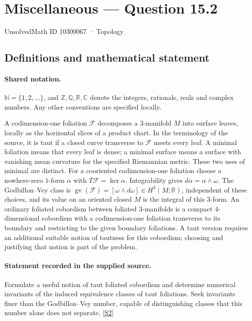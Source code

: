 \documentclass[11pt]{article}
\newcommand{\sref}[2]{\hyperlink{source:#1:#2}{[S#2]}}
\begin{document}
\setcounter{section}{10300066}
\section{Miscellaneous — Question 15.2}\label{10300067}
{\small\sffamily UnsolvedMath ID 10300067 · Topology}
\subsection{Definitions and mathematical statement}

\paragraph{Shared notation.}$\mathbb N=\{1,2,\ldots\}$, and $\mathbb Z,\mathbb Q,\mathbb R,\mathbb C$ denote the integers, rationals, reals and complex numbers. Any other conventions are specified locally.


A codimension-one foliation $\mathcal F$ decomposes a $3$-manifold $M$ into surface leaves, locally as the horizontal slices of a product chart. In the terminology of the source, it is taut if a closed curve transverse to $\mathcal F$ meets every leaf. A minimal foliation means that every leaf is dense; a minimal surface means a surface with vanishing mean curvature for the specified Riemannian metric. These two uses of minimal are distinct. For a cooriented codimension-one foliation choose a nowhere-zero $1$-form $\alpha$ with $T\mathcal F=\ker\alpha$. Integrability gives $d\alpha=\alpha\wedge\omega$. The Godbillon--Vey class is $\operatorname{gv}(\mathcal F)=[\omega\wedge d\omega]\in H^3(M;\mathbb R)$, independent of these choices, and its value on an oriented closed $M$ is the integral of this $3$-form. An ordinary foliated cobordism between foliated $3$-manifolds is a compact $4$-dimensional cobordism with a codimension-one foliation transverse to its boundary and restricting to the given boundary foliations. A taut version requires an additional suitable notion of tautness for this cobordism; choosing and justifying that notion is part of the problem.
\paragraph{Statement recorded in the supplied source.}
Formulate a useful notion of taut foliated cobordism and determine numerical invariants of the induced equivalence classes of taut foliations. Seek invariants finer than the Godbillon--Vey number, capable of distinguishing classes that this number alone does not separate. \sref{10300067}{2}
\end{document}
